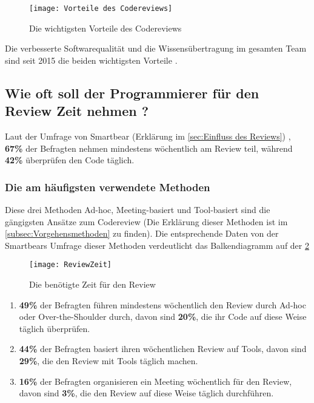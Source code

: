 \begin{figure}[H]
	\centering
	\texttt{[image: Vorteile des Codereviews]}
	\caption[Vorteile des Codereviews]{Die wichtigsten Vorteile des Codereviews\\ \cite{smartbear}}
	\label{fig:Vorteile des Codereviews}
\end{figure}

Die verbesserte Softwarequalität und die Wissensübertragung im gesamten Team sind seit 2015 die beiden wichtigsten Vorteile \cite{smartbear}.

\subsection{Wie oft soll der Programmierer für den Review Zeit nehmen ?}
\label{subsec:reviewerZeit}

Laut der Umfrage von Smartbear (Erklärung im \cref{sec:Einfluss des Reviews}) \cite{smartbear}, \textbf{67\%} der Befragten nehmen mindestens wöchentlich am Review teil, während \textbf{42\%} überprüfen den Code täglich.

\subsubsection{Die am häufigsten verwendete Methoden}
\label{subsubsec:Die am häufigsten verwendete Methoden}

Diese drei Methoden Ad-hoc, Meeting-basiert und Tool-basiert sind die gängigsten Ansätze zum Codereview (Die Erklärung dieser Methoden ist im \cref{subsec:Vorgehensmethoden} zu finden).
Die entsprechende Daten von der Smartbears Umfrage \cite{smartbear} dieser Methoden verdeutlicht das Balkendiagramm auf der \cref{fig:ReviewZeit} 

\begin{figure}[H]
	\centering
	\texttt{[image: ReviewZeit]}
	\caption[Reviews Zeit]{Die benötigte Zeit für den Review\\ \cite{smartbear}}
	\label{fig:ReviewZeit}
\end{figure}

\begin{enumerate}
	\item \textbf{49\%} der Befragten führen mindestens wöchentlich den Review durch Ad-hoc oder Over-the-Shoulder durch, davon sind \textbf{20\%}, die ihr Code auf diese Weise 					täglich überprüfen.
	\item \textbf{44\%} der Befragten basiert ihren wöchentlichen Review auf Tools, davon sind \textbf{29\%}, die den Review mit Tools täglich machen.
	\item \textbf{16\%} der Befragten organisieren ein Meeting wöchentlich für den Review, davon sind \textbf{3\%}, die den Review auf diese Weise täglich durchführen.
\end{enumerate}


